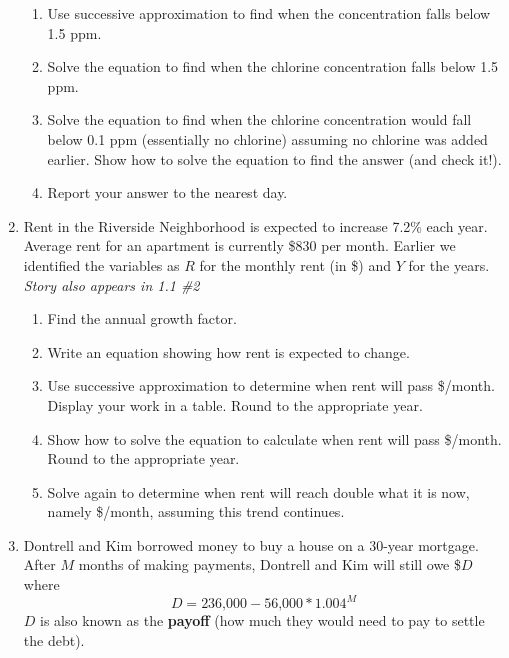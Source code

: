 \begin{enumerate}
\begin{enumerate}
\item Use successive approximation to find when the concentration falls below 1.5 ppm.  \vfill
\item Solve the equation to find when the chlorine concentration falls below 1.5 ppm.  \vfill 
\item Solve the equation to find when the chlorine concentration would fall below 0.1 ppm (essentially no chlorine) assuming no chlorine was added earlier.  Show how to solve the equation to find the answer (and check it!). \vfill
\item Report your answer to the nearest day. \vfill
\end{enumerate} 

\newpage %

\item Rent in the Riverside Neighborhood is expected to increase 7.2\% each year.  Average rent for an apartment is currently \$830 per month.  Earlier we identified the variables as $R$ for the monthly rent  (in \$) and $Y$ for the years.
\hfill \emph{Story also appears in 1.1 \#2} 
\begin{enumerate}
\item Find the annual growth factor. \vfill
\item Write an equation showing how rent is expected to change. \vfill
\item Use successive approximation to determine when rent will pass \$/month.  Display your work in a table.  Round to the appropriate year. \vfill \vfill
\item Show how to solve the equation to calculate when rent will pass \$/month.  Round to the appropriate year. \vfill \vfill
\item Solve again to determine when rent will reach double what it is now, namely  \$/month, assuming this trend continues. \vfill \vfill
\end{enumerate} 

\newpage %

\item Dontrell and Kim borrowed money to buy a house on a 30-year mortgage.  After $M$ months of making payments, Dontrell and Kim will still owe \$$D$ where $$D=\text{236,000}-\text{56,000} \ast 1.004^M$$  
$D$ is also known as the \textbf{payoff} (how much they would need to pay to settle the debt).


\end{enumerate}
